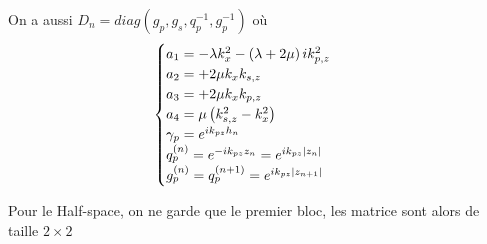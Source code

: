 On a aussi $D_n = diag(g_p,g_s,q_p^{-1},g_p^{-1})$
où 
\begin{align*}
    \begin{cases}
        a_1 = -\lambda k_x^2 - \left( \lambda+2\mu \right) ik_{p,z}^2 \\
        a_2 = +2\mu k_x k_{s,z} ~~~~~~\\
        a_3 = +2\mu k_x k_{p,z} ~~~~~~\\
        a_4 = \mu \left( k_{s,z}^2 - k_x^2 \right) \\ 
        \gamma_p = e^{ik_{pz}h_n} \\
        q_p^{(n)} = e^{-ik_{pz}z_n} =  e^{ik_{pz}|z_n|}  ~~~~~~ \\
        g_p^{(n)} = q_p^{(n+1)} = e^{ik_{pz}|z_{n+1}|} ~~~~~~
    \end{cases} 
\end{align*}

Pour le Half-space, on ne garde que le premier bloc, les matrice sont alors de taille $2\times 2$\par 

